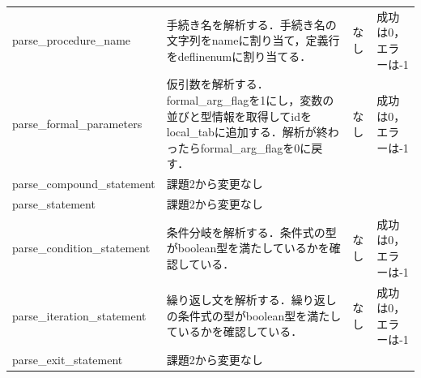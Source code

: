 \documentclass{jlreq}
\begin{document}
\begin{table}[H]
{\begin{tabular}{|l|p{15cm}|l|p{6cm}|}
      parse\_procedure\_name          & 手続き名を解析する．手続き名の文字列をnameに割り当て，定義行をdeflinenumに割り当てる．                                                                                                                                                                         & なし & 成功は0，エラーは-1                \\
      parse\_formal\_parameters       & 仮引数を解析する．formal\_arg\_flagを1にし，変数の並びと型情報を取得してidをlocal\_tabに追加する．解析が終わったらformal\_arg\_flagを0に戻す．                                                                                                                 & なし & 成功は0，エラーは-1                \\
      parse\_compound\_statement      & 課題2から変更なし                                                                                                                                                                                                                                              & ~    & ~                                  \\
      parse\_statement                & 課題2から変更なし                                                                                                                                                                                                                                              & ~    & ~                                  \\
      parse\_condition\_statement     & 条件分岐を解析する．条件式の型がboolean型を満たしているかを確認している．                                                                                                                                                                                      & なし & 成功は0，エラーは-1                \\
      parse\_iteration\_statement     & 繰り返し文を解析する．繰り返しの条件式の型がboolean型を満たしているかを確認している．                                                                                                                                                                          & なし & 成功は0，エラーは-1                \\
      parse\_exit\_statement          & 課題2から変更なし                                                                                                                                                                                                                                              & ~    & ~                                  \\

\end{tabular}}
\end{table}
\end{document}
